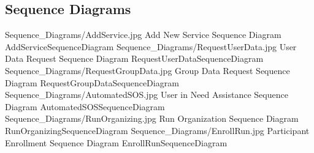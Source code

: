 \documentclass[../../../rasd.tex]{subfiles}
\begin{document}
\subsection{Sequence Diagrams}
\image {13cm} {Sequence_Diagrams/AddService.jpg} {Add New Service Sequence Diagram} {AddServiceSequenceDiagram}
\image {13cm} {Sequence_Diagrams/RequestUserData.jpg} {User Data Request Sequence Diagram} {RequestUserDataSequenceDiagram}
\image {13cm} {Sequence_Diagrams/RequestGroupData.jpg} {Group Data Request Sequence Diagram} {RequestGroupDataSequenceDiagram}
\image {13cm} {Sequence_Diagrams/AutomatedSOS.jpg} {User in Need Assistance Sequence Diagram} {AutomatedSOSSequenceDiagram}
\image {13cm} {Sequence_Diagrams/RunOrganizing.jpg} {Run Organization Sequence Diagram} {RunOrganizingSequenceDiagram}
\image {13cm} {Sequence_Diagrams/EnrollRun.jpg} {Participant Enrollment Sequence Diagram} {EnrollRunSequenceDiagram}
\end{document}
